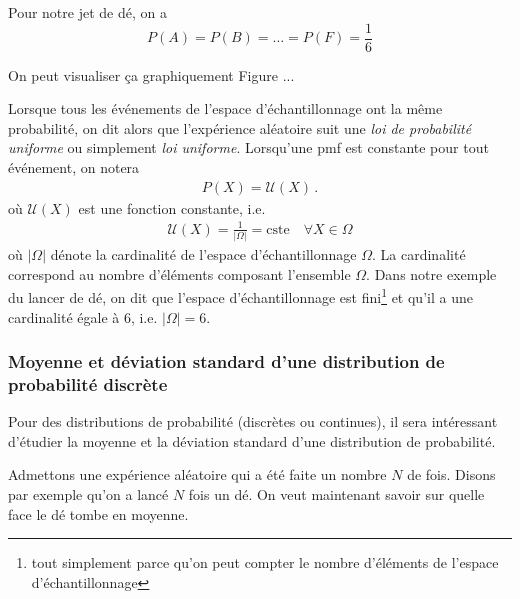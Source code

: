 \documentclass[titlepage]{article}
\theoremstyle{cleanremark}
\begin{document}
Pour notre jet de dé, on a
\begin{equation}
    P(A)=P(B)=\dots = P(F) = \frac{1}{6}
\end{equation}

On peut visualiser ça graphiquement Figure ...

Lorsque tous les événements de l'espace d'échantillonnage ont la même probabilité, on dit alors que l'expérience aléatoire suit une \textit{loi de probabilité uniforme} ou simplement \textit{loi uniforme}. Lorsqu'une pmf est constante pour tout événement, on notera
\begin{align}
    P(X)=\mathcal{U}(X)\, .
\end{align}
où $\mathcal{U}(X)$ est une fonction constante, i.e.
\begin{align}
    \mathcal{U}(X)=\frac{1}{\lvert \Omega \rvert}=\text{cste} \quad \forall X\in \Omega
\end{align}
où $\lvert \Omega\rvert$ dénote la cardinalité de l'espace d'échantillonnage $\Omega$. La cardinalité correspond au nombre d'éléments composant l'ensemble $\Omega$. Dans notre exemple du lancer de dé, on dit que l'espace d'échantillonnage est fini\footnote{tout simplement parce qu'on peut compter le nombre d'éléments de l'espace d'échantillonnage} et qu'il a une cardinalité égale à 6, i.e. $\lvert \Omega \rvert = 6$. 

\subsubsection{Moyenne et déviation standard d'une distribution de probabilité discrète}
Pour des distributions de probabilité (discrètes ou continues), il sera intéressant d'étudier la moyenne et la déviation standard d'une distribution de probabilité.

Admettons une expérience aléatoire qui a été faite un nombre $N$ de fois. Disons par exemple qu'on a lancé $N$ fois un dé. On veut maintenant savoir sur quelle face le dé tombe en moyenne.  
\end{document}
